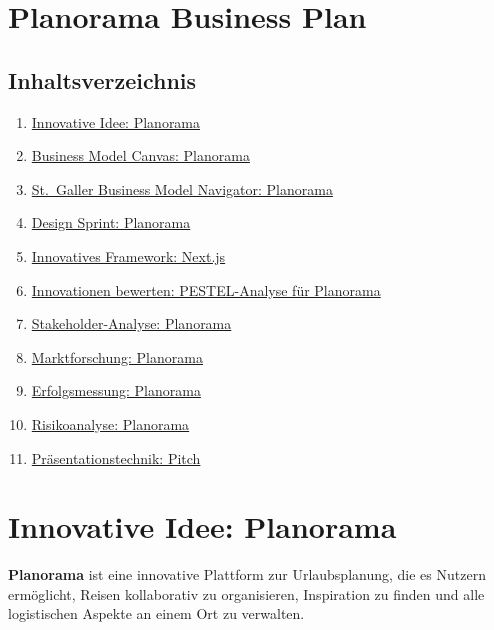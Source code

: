 \documentclass{article}
\begin{document}
  {
    \hypersetup{linkcolor=black}
    \tableofcontents
  }

\section{Planorama Business Plan}\label{planorama-business-plan}

\subsection{Inhaltsverzeichnis}\label{inhaltsverzeichnis}

\begin{enumerate}
\def\labelenumi{\arabic{enumi}.}
\tightlist
\item
  \hyperref[innovative-idee-planorama]{Innovative Idee: Planorama}
\item
  \hyperref[business-model-canvas-planorama]{Business Model Canvas:
  Planorama}
\item
  \hyperref[st-galler-business-model-navigator-planorama]{St.~Galler
  Business Model Navigator: Planorama}
\item
  \hyperref[design-sprint-planorama]{Design Sprint: Planorama}
\item
  \hyperref[innovatives-framework-nextjs]{Innovatives Framework:
  Next.js}
\item
  \hyperref[innovationen-bewerten-pestel-analyse-fuxfcr-planorama]{Innovationen
  bewerten: PESTEL-Analyse für Planorama}
\item
  \hyperref[stakeholder-analyse-planorama]{Stakeholder-Analyse:
  Planorama}
\item
  \hyperref[marktforschung-planorama]{Marktforschung: Planorama}
\item
  \hyperref[erfolgsmessung-planorama]{Erfolgsmessung: Planorama}
\item
  \hyperref[risikoanalyse-planorama]{Risikoanalyse: Planorama}
\item
  \hyperref[pruxe4sentationstechnik-pitch]{Präsentationstechnik: Pitch}
\end{enumerate}

\newpage

\section{Innovative Idee: Planorama}\label{innovative-idee-planorama}

\textbf{Planorama} ist eine innovative Plattform zur Urlaubsplanung, die
es Nutzern ermöglicht, Reisen kollaborativ zu organisieren, Inspiration
zu finden und alle logistischen Aspekte an einem Ort zu verwalten.
\end{document}
